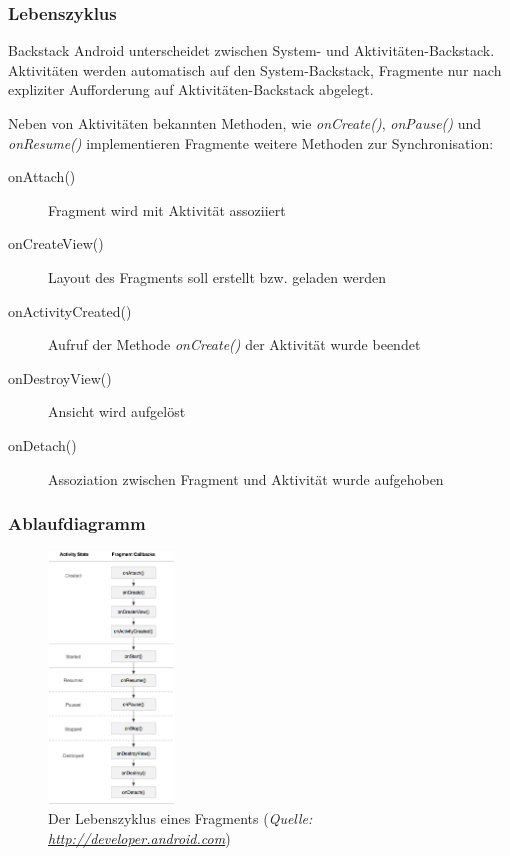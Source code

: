 \begin{frame}[label=fragments]
   \frametitle{Lebenszyklus}
   
   \begin{alertblock}{Backstack}
		Android unterscheidet zwischen System- und Aktivitäten-Backstack. Aktivitäten 
		werden automatisch auf den System-Backstack, Fragmente nur nach expliziter 
		Aufforderung auf Aktivitäten-Backstack abgelegt. 
   \end{alertblock}
   
   Neben von Aktivitäten bekannten Methoden, wie \emph{onCreate()}, \emph{onPause()} 
	und \emph{onResume()} implementieren Fragmente weitere Methoden zur Synchronisation:

	\begin{description}
		\item[onAttach()] Fragment wird mit Aktivität assoziiert
		\item[onCreateView()] Layout des Fragments soll erstellt bzw. geladen werden
		\item[onActivityCreated()] Aufruf der Methode \emph{onCreate()} der Aktivität wurde beendet
		\item[onDestroyView()] Ansicht wird aufgelöst
		\item[onDetach()] Assoziation zwischen Fragment und Aktivität wurde aufgehoben
	\end{description}
\end{frame}

\begin{frame}[label=activity_fragment_lifecycle]
   \frametitle{Ablaufdiagramm}
	\begin{figure}[h!]
	  \centering
	  \includegraphics[width=0.3\textwidth]{pictures/activity_fragment_lifecycle.eps}
	  \caption{
		  Der Lebenszyklus eines Fragments
		  (\emph{Quelle: 
		     \href{http://developer.android.com}{http://developer.android.com}})
	  }
	  \label{fig:activity_fragment_lifecycle}
	\end{figure}
\end{frame}

